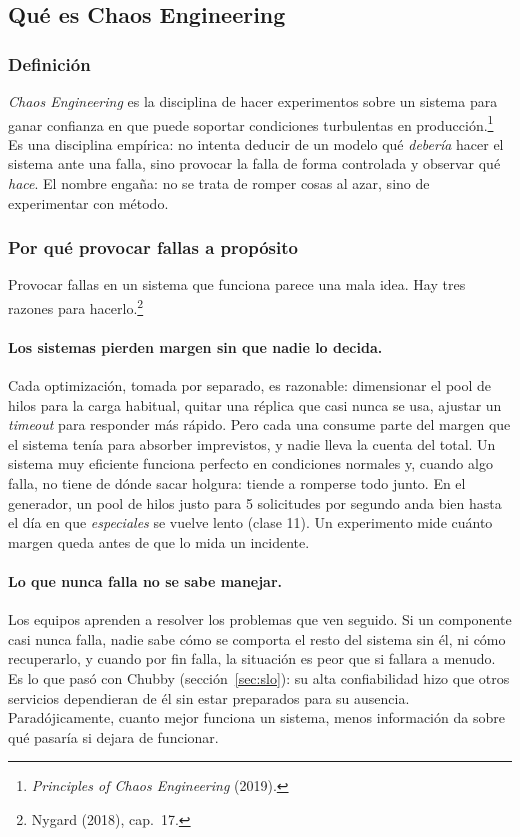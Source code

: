 \documentclass[variant=apuntes,cover=institutional,mode=screen]{ua-engineering-v6-article}
\begin{document}
\subsection{Qué es Chaos Engineering}

\subsubsection{Definición}

\emph{Chaos Engineering} es la disciplina de hacer experimentos sobre un sistema para ganar confianza en que puede soportar condiciones turbulentas en producción.\footnote{\emph{Principles of Chaos Engineering} (2019).} Es una disciplina empírica: no intenta deducir de un modelo qué \emph{debería} hacer el sistema ante una falla, sino provocar la falla de forma controlada y observar qué \emph{hace}. El nombre engaña: no se trata de romper cosas al azar, sino de experimentar con método.

\subsubsection{Por qué provocar fallas a propósito}

Provocar fallas en un sistema que funciona parece una mala idea. Hay tres razones para hacerlo.\footnote{Nygard (2018), cap.~17.}

\paragraph{Los sistemas pierden margen sin que nadie lo decida.} Cada optimización, tomada por separado, es razonable: dimensionar el pool de hilos para la carga habitual, quitar una réplica que casi nunca se usa, ajustar un \emph{timeout} para responder más rápido. Pero cada una consume parte del margen que el sistema tenía para absorber imprevistos, y nadie lleva la cuenta del total. Un sistema muy eficiente funciona perfecto en condiciones normales y, cuando algo falla, no tiene de dónde sacar holgura: tiende a romperse todo junto. En el generador, un pool de hilos justo para 5 solicitudes por segundo anda bien hasta el día en que \emph{especiales} se vuelve lento (clase 11). Un experimento mide cuánto margen queda antes de que lo mida un incidente.

\paragraph{Lo que nunca falla no se sabe manejar.} Los equipos aprenden a resolver los problemas que ven seguido. Si un componente casi nunca falla, nadie sabe cómo se comporta el resto del sistema sin él, ni cómo recuperarlo, y cuando por fin falla, la situación es peor que si fallara a menudo. Es lo que pasó con Chubby (sección~\ref{sec:slo}): su alta confiabilidad hizo que otros servicios dependieran de él sin estar preparados para su ausencia. Paradójicamente, cuanto mejor funciona un sistema, menos información da sobre qué pasaría si dejara de funcionar.
\end{document}
